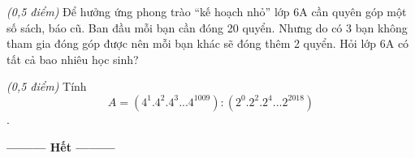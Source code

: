 \begin{ex}
\begin{enumerate}[a)]
\end{enumerate}
\end{ex}     \begin{ex}\textit{(0,5 điểm)} Để hưởng ứng phong trào “kế hoạch nhỏ” lớp 6A cần quyên góp một số sách, báo cũ. Ban đầu mỗi bạn cần đóng 20 quyển. Nhưng do có 3 bạn không tham gia đóng góp được nên mỗi bạn khác sẽ đóng thêm 2 quyển. Hỏi lớp 6A có tất cả bao nhiêu học sinh?\\
\end{ex}     \begin{ex}\textit{(0,5 điểm)} Tính \[A = \left( {{4^1}{{.4}^2}{{.4}^3}{{...4}^{1009}}} \right):\left( {{2^0}{{.2}^2}{{.2}^4}{{...2}^{2018}}} \right)\].
\end{ex}
\begin{center}
\textbf{\textbf{---------} Hết \textbf{---------}}
\end{center}
